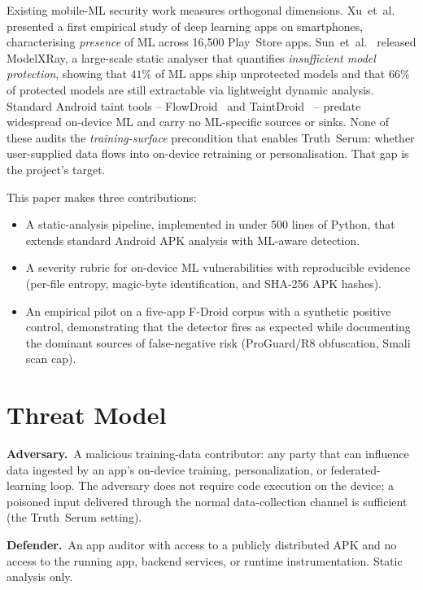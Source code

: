 \documentclass[conference]{IEEEtran}
\begin{document}
Existing mobile-ML security work measures orthogonal dimensions.
Xu~et~al.~\cite{xu2019} presented a first empirical study of deep
learning apps on smartphones, characterising \emph{presence} of ML
across 16{,}500 Play~Store apps. Sun~et~al.~\cite{modelxray} released
ModelXRay, a large-scale static analyser that quantifies
\emph{insufficient model protection}, showing that $41\%$ of ML apps
ship unprotected models and that $66\%$ of protected models are still
extractable via lightweight dynamic analysis. Standard Android taint
tools -- FlowDroid~\cite{flowdroid} and
TaintDroid~\cite{taintdroid} -- predate widespread on-device ML and
carry no ML-specific sources or sinks. None of these audits the
\emph{training-surface} precondition that enables Truth~Serum: whether
user-supplied data flows into on-device retraining or personalisation.
That gap is the project's target.

This paper makes three contributions:
\begin{itemize}
\item A static-analysis pipeline, implemented in under 500 lines of
  Python, that extends standard Android APK analysis with ML-aware
  detection.
\item A severity rubric for on-device ML vulnerabilities with
  reproducible evidence (per-file entropy, magic-byte identification,
  and SHA-256 APK hashes).
\item An empirical pilot on a five-app F-Droid corpus with a synthetic
  positive control, demonstrating that the detector fires as expected
  while documenting the dominant sources of false-negative risk
  (ProGuard/R8 obfuscation, Smali scan cap).
\end{itemize}

\section{Threat Model}
\label{sec:threat_model}

\noindent \textbf{Adversary.}~A malicious training-data contributor:
any party that can influence data ingested by an app's on-device
training, personalization, or federated-learning loop. The adversary
does not require code execution on the device; a poisoned input
delivered through the normal data-collection channel is sufficient
(the Truth~Serum setting).

\noindent \textbf{Defender.}~An app auditor with access to a publicly
distributed APK and no access to the running app, backend services, or
runtime instrumentation. Static analysis only.
\end{document}
